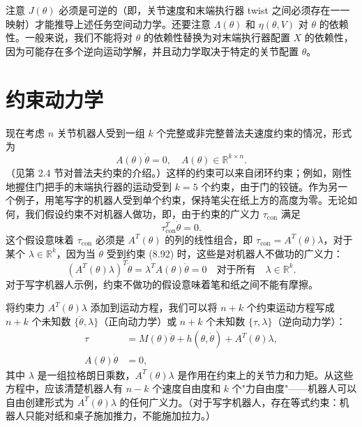 \documentclass[12pt,a4paper]{article}
\begin{document}
注意 $J(\theta)$ 必须是可逆的（即，关节速度和末端执行器 twist 之间必须存在一一映射）才能推导上述任务空间动力学。还要注意 $\Lambda(\theta)$ 和 $\eta(\theta, V)$ 对 $\theta$ 的依赖性。一般来说，我们不能将对 $\theta$ 的依赖性替换为对末端执行器配置 $X$ 的依赖性，因为可能存在多个逆向运动学解，并且动力学取决于特定的关节配置 $\theta$。

\section{约束动力学}
现在考虑 $n$ 关节机器人受到一组 $k$ 个完整或非完整普法夫速度约束的情况，形式为
\begin{equation}
A(\theta)\dot{\theta} = 0, \quad A(\theta) \in \mathbb{R}^{k \times n}. \label{eq:8.92}
\end{equation}
（见第 2.4 节对普法夫约束的介绍。）这样的约束可以来自闭环约束；例如，刚性地握住门把手的末端执行器的运动受到 $k = 5$ 个约束，由于门的铰链。作为另一个例子，用笔写字的机器人受到单个约束，保持笔尖在纸上方的高度为零。无论如何，我们假设约束不对机器人做功，即，由于约束的广义力 $\tau_{\text{con}}$ 满足
\begin{equation}
\tau_{\text{con}}^T \dot{\theta} = 0.
\end{equation}
这个假设意味着 $\tau_{\text{con}}$ 必须是 $A^T(\theta)$ 的列的线性组合，即 $\tau_{\text{con}} = A^T(\theta)\lambda$，对于某个 $\lambda \in \mathbb{R}^k$，因为当 $\dot{\theta}$ 受到约束 (8.92) 时，这些是对机器人不做功的广义力：
\begin{equation}
(A^T(\theta)\lambda)^T \dot{\theta} = \lambda^T A(\theta)\dot{\theta} = 0 \quad \text{对于所有} \quad \lambda \in \mathbb{R}^k.
\end{equation}
对于写字机器人示例，约束不做功的假设意味着笔和纸之间不能有摩擦。

将约束力 $A^T(\theta)\lambda$ 添加到运动方程，我们可以将 $n+k$ 个约束运动方程写成 $n+k$ 个未知数 $\{\ddot{\theta}, \lambda\}$（正向动力学）或 $n+k$ 个未知数 $\{\tau, \lambda\}$（逆向动力学）：
\begin{align}
\tau &= M(\theta)\ddot{\theta} + h(\theta, \dot{\theta}) + A^T(\theta)\lambda, \label{eq:8.93} \\
A(\theta)\dot{\theta} &= 0, \label{eq:8.94}
\end{align}
其中 $\lambda$ 是一组拉格朗日乘数，$A^T(\theta)\lambda$ 是作用在约束上的关节力和力矩。从这些方程中，应该清楚机器人有 $n-k$ 个速度自由度和 $k$ 个"力自由度"——机器人可以自由创建形式为 $A^T(\theta)\lambda$ 的任何广义力。（对于写字机器人，存在等式约束：机器人只能对纸和桌子施加推力，不能施加拉力。）
\end{document}
